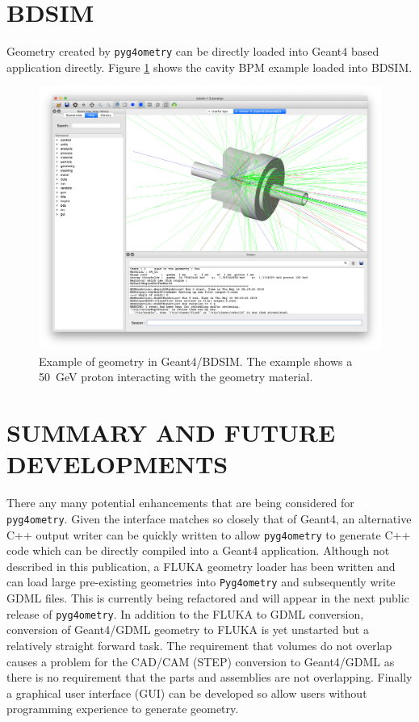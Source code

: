 \documentclass[a4paper,
               keeplastbox,   %
               ]{jacow}
\begin{document}
\section{BDSIM}
Geometry created by \verb|pyg4ometry| can be directly loaded into Geant4 based application directly. Figure \ref{fig:dipole-bdsim} shows the cavity BPM 
example loaded into BDSIM. 
\begin{figure}[h!tb]
   \centering
   \includegraphics*[width=1.0\columnwidth]{./examples/dipole_bdsim.jpg}
   \caption{Example of geometry in Geant4/BDSIM. The example shows a 50~GeV proton interacting with the geometry material.}
   \label{fig:dipole-bdsim}
\end{figure}

\section{SUMMARY AND FUTURE DEVELOPMENTS}
There any many potential enhancements that are being considered for \verb|pyg4ometry|. Given the interface matches so closely that of Geant4, 
an alternative C++ output writer can be quickly written to allow \verb|pyg4ometry| to generate C++ code which can be directly compiled into a 
Geant4 application. Although not described in this publication, a FLUKA geometry loader has been written and can load large pre-existing geometries into 
\verb|Pyg4ometry| and subsequently write GDML files. This is currently being refactored and will appear in the next public release of \verb|pyg4ometry|.
In addition to the FLUKA to GDML conversion, conversion of Geant4/GDML geometry to FLUKA is yet unstarted but a relatively straight forward
task. The requirement that volumes do not overlap causes a problem for the CAD/CAM (STEP) conversion to Geant4/GDML as there is no requirement 
that the parts and assemblies are not overlapping. Finally a graphical user interface (GUI) can be developed so allow users without programming 
experience to generate geometry.
\end{document}
